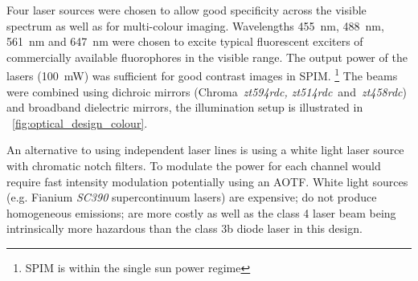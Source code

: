 Four %
laser sources were chosen to allow good specificity across the visible spectrum as well  as for multi-colour imaging.
Wavelengths \textcolor{455nm}{\SI{455}{\nano\meter}},  \textcolor{488nm}{\SI{488}{\nano\meter}},  \textcolor{561nm}{\SI{561}{\nano\meter}} and \textcolor{647nm}{\SI{647}{\nano\meter}} were chosen to excite typical fluorescent exciters of commercially available fluorophores in the visible range.
The output power of the lasers (\SI{100}{\milli\watt}) was sufficient for good contrast images in SPIM.\@
\footnote{SPIM is within the single sun power regime} %
The beams were combined %
using dichroic mirrors %
(Chroma~\emph{zt594rdc, zt514rdc}~and~\emph{zt458rdc}) and broadband dielectric mirrors,
the illumination setup is illustrated in \figurename~\ref{fig:optical_design_colour}.

An alternative to using independent laser lines is using a white light laser source with chromatic notch filters. %
To modulate the power for each channel would require fast intensity modulation potentially using an \gls{AOTF}.
White light sources (e.g. Fianium \emph{SC390} supercontinuum lasers) are expensive; do not produce homogeneous emissions;
are more costly as well as the class 4 laser beam being intrinsically more hazardous than the class 3b diode laser in this design.


